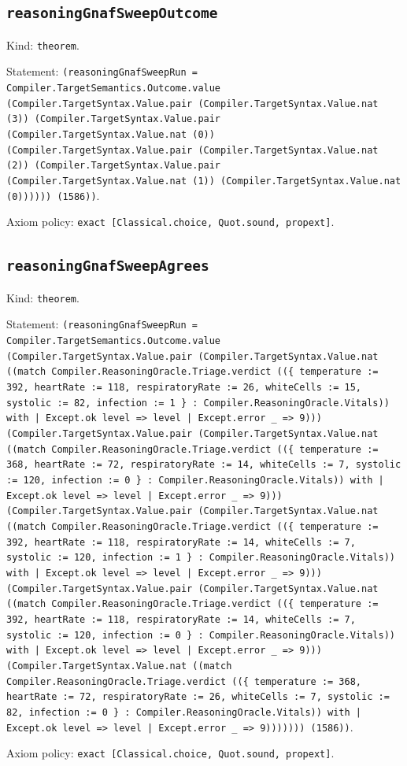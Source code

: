 \documentclass[11pt]{article}
\begin{document}
\subsection*{\texttt{reasoningGnafSweepOutcome}}
\noindent Kind: \texttt{theorem}.\par
\noindent Statement: \texttt{(reasoningGnafSweepRun = Compiler.TargetSemantics.Outcome.value (Compiler.TargetSyntax.Value.pair (Compiler.TargetSyntax.Value.nat (3)) (Compiler.TargetSyntax.Value.pair (Compiler.TargetSyntax.Value.nat (0)) (Compiler.TargetSyntax.Value.pair (Compiler.TargetSyntax.Value.nat (2)) (Compiler.TargetSyntax.Value.pair (Compiler.TargetSyntax.Value.nat (1)) (Compiler.TargetSyntax.Value.nat (0)))))) (1586))}.\par
\noindent Axiom policy: \texttt{exact [Classical.choice, Quot.sound, propext]}.\par
\subsection*{\texttt{reasoningGnafSweepAgrees}}
\noindent Kind: \texttt{theorem}.\par
\noindent Statement: \texttt{(reasoningGnafSweepRun = Compiler.TargetSemantics.Outcome.value (Compiler.TargetSyntax.Value.pair (Compiler.TargetSyntax.Value.nat ((match Compiler.ReasoningOracle.Triage.verdict ((\{ temperature := 392, heartRate := 118, respiratoryRate := 26, whiteCells := 15, systolic := 82, infection := 1 \} : Compiler.ReasoningOracle.Vitals)) with | Except.ok level => level | Except.error \_ => 9))) (Compiler.TargetSyntax.Value.pair (Compiler.TargetSyntax.Value.nat ((match Compiler.ReasoningOracle.Triage.verdict ((\{ temperature := 368, heartRate := 72, respiratoryRate := 14, whiteCells := 7, systolic := 120, infection := 0 \} : Compiler.ReasoningOracle.Vitals)) with | Except.ok level => level | Except.error \_ => 9))) (Compiler.TargetSyntax.Value.pair (Compiler.TargetSyntax.Value.nat ((match Compiler.ReasoningOracle.Triage.verdict ((\{ temperature := 392, heartRate := 118, respiratoryRate := 14, whiteCells := 7, systolic := 120, infection := 1 \} : Compiler.ReasoningOracle.Vitals)) with | Except.ok level => level | Except.error \_ => 9))) (Compiler.TargetSyntax.Value.pair (Compiler.TargetSyntax.Value.nat ((match Compiler.ReasoningOracle.Triage.verdict ((\{ temperature := 392, heartRate := 118, respiratoryRate := 14, whiteCells := 7, systolic := 120, infection := 0 \} : Compiler.ReasoningOracle.Vitals)) with | Except.ok level => level | Except.error \_ => 9))) (Compiler.TargetSyntax.Value.nat ((match Compiler.ReasoningOracle.Triage.verdict ((\{ temperature := 368, heartRate := 72, respiratoryRate := 26, whiteCells := 7, systolic := 82, infection := 0 \} : Compiler.ReasoningOracle.Vitals)) with | Except.ok level => level | Except.error \_ => 9))))))) (1586))}.\par
\noindent Axiom policy: \texttt{exact [Classical.choice, Quot.sound, propext]}.\par
\end{document}
